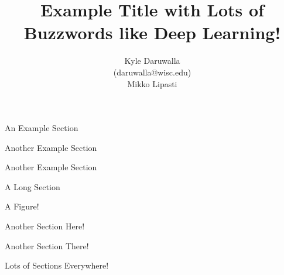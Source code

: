 \documentclass{pharmposter}
\title{Example Title with Lots of Buzzwords like Deep Learning!}
\author{Kyle Daruwalla \\ {\Large(daruwalla@wisc.edu)} \\ Mikko Lipasti}
\begin{document}
	\begin{sectionbox}{An Example Section}
		\lipsum[1-2]
	\end{sectionbox}

	\begin{sectionbox}{Another Example Section}
		\lipsum[3]
	\end{sectionbox}

	\begin{sectionbox}{Another Example Section}
		\lipsum[2]
	\end{sectionbox}

	\begin{sectionbox}{A Long Section}
		\lipsum[2-5]
	\end{sectionbox}

	\begin{sectionbox}{A Figure!}
		\begin{center}
		\end{center}
	\end{sectionbox}

	\begin{sectionbox}{Another Section Here!}
		\lipsum[4-5]
	\end{sectionbox}

	\begin{sectionbox}{Another Section There!}
		\lipsum[6]
	\end{sectionbox}

	\begin{sectionbox}{Lots of Sections Everywhere!}
		\lipsum[7-8]
	\end{sectionbox}
\end{document}
